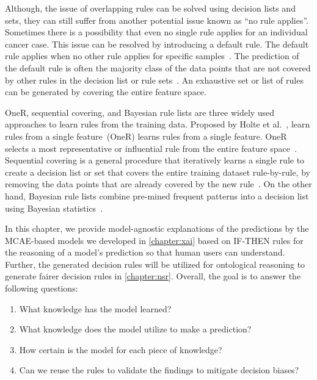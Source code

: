 \hspace*{3.5mm} Although, the issue of overlapping rules can be solved using decision lists and sets, they can still suffer from another potential issue known as ``no rule applies''. Sometimes there is a possibility that even no single rule applies for an individual cancer case.
This issue can be resolved by introducing a default rule. The default rule applies when no other rule applies for specific samples~\cite{molnar2019interpretable}. The prediction of the default rule is often the majority class of the data points that are not covered by other rules in the decision list or rule sets~\cite{molnar2019interpretable}. An exhaustive set or list of rules can be generated by covering the entire feature space. 

\hspace*{3.5mm} OneR, sequential covering, and Bayesian rule lists are three widely used approaches to learn rules from the training data. Proposed by Holte et al.~\cite{holte1993very}, learn rules from a single feature~(OneR) learns rules from a single feature. OneR selects a most representative or influential rule from the entire feature space~\cite{molnar2019interpretable}. Sequential covering is a general procedure that iteratively learns a single rule to create a decision list or set that covers the entire training dataset rule-by-rule, by removing the data points that are already covered by the new rule~\cite{molnar2019interpretable}. On the other hand, Bayesian rule lists combine pre-mined frequent patterns into a decision list using Bayesian statistics~\cite{molnar2019interpretable}. 

\hspace*{3.5mm} In this chapter, we provide model-agnostic explanations of the predictions by the MCAE-based models we developed in \cref{chapter:xai} based on IF-THEN rules for the reasoning of a model's prediction so that human users can understand. Further, the generated decision rules will be utilized for ontological reasoning to generate fairer decision rules in \cref{chapter:nsr}. Overall, the goal is to answer the following questions: 

\begin{enumerate}[noitemsep]
    \item What knowledge has the model learned?
    \item What knowledge does the model utilize to make a prediction?
    \item How certain is the model for each piece of knowledge? 
    \item Can we reuse the rules to validate the findings to mitigate decision biases? 
\end{enumerate}

